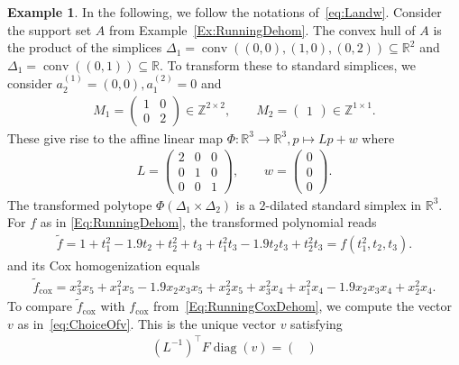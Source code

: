 \documentclass[a4paper,11pt]{amsart}
\theoremstyle{definition}
\newtheorem{example}[theorem]{Example}
\DeclareMathOperator{\conv}{conv}
\DeclareMathOperator{\diag}{diag}
\newcommand{\ZZ}{\mathbb{Z}}
\newcommand{\RR}{\mathbb{R}}
\newcommand{\cox}{\mathrm{cox}}
\begin{document}
\begin{example}
\label{Ex:Running:Cox}
In the following, we follow the notations of~\eqref{eq:Landw}.
Consider the support set $A$ from Example~\ref{Ex:RunningDehom}. The convex hull of $A$ is the product of the simplices $\Delta_1 = \conv((0,0),(1,0),(0,2)) \subseteq \RR^2$ and $\Delta_1 = \conv((0,1)) \subseteq \RR$. To transform these to standard simplices, we consider $a_2^{(1)} = (0,0), a_1^{(2)} = 0$ and 
\begin{align*}
    M_1 = \begin{pmatrix}
        1 & 0 \\
        0 & 2
    \end{pmatrix} \in \ZZ^{2 \times 2}, \qquad     M_2 = \begin{pmatrix}
        1
    \end{pmatrix} \in \ZZ^{1 \times 1}.
\end{align*}
These give rise to the affine linear map $\Phi\colon \RR^3 \to \RR^3, p \mapsto Lp + w$ where
\begin{align*}
    L = \begin{pmatrix}
        2 & 0 & 0\\
        0 & 1 & 0\\
        0 & 0 & 1
    \end{pmatrix}, \qquad w = \begin{pmatrix}
        0\\
        0\\
        0
    \end{pmatrix}.
\end{align*}
The transformed polytope $\Phi(\Delta_1 \times \Delta_2)$ is a $2$-dilated standard simplex in $\RR^3$. For $f$ as in \eqref{Eq:RunningDehom}, the transformed polynomial reads
 \begin{align*}
         \widetilde{f} = 1+t_1^2 - 1.9t_2 + t_2^2  +t_3 + t_1^2t_3-1.9t_2t_3+t_2^2t_3 = f(t_1^2,t_2,t_3).
    \end{align*}
and its Cox homogenization equals
\begin{align*}
    \widetilde{f}_\cox = x_3^2x_5 + x_1^2 x_5 -1.9 x_2x_3x_5 + x_2^2x_5+x_3^2x_4 + x_1^2x_4-1.9x_2x_3x_4+x_2^2x_4.
\end{align*}
To compare $\widetilde{f}_\cox$ with $f_\cox$ from~\eqref{Eq:RunningCoxDehom}, we compute the vector $v$ as in~\eqref{eq:ChoiceOfv}. This is the unique vector $v$ satisfying 
\begin{align}
    (L^{-1})^\top F \diag(v) = \begin{pmatrix}

\end{pmatrix}
\end{align}
\end{example}
\end{document}
